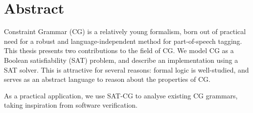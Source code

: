 \chapter*{Abstract}\label{chp:abstract}






Constraint Grammar (CG) is a relatively young formalism, born out of practical 
need for a robust and language-independent method for part-of-speech
tagging.
This thesis presents two contributions to the field of CG.
We model CG as a Boolean satisfiability (SAT) problem, and
describe an implementation using a SAT solver.
This is attractive for several reasons: formal logic is well-studied,
and serves as an abstract language to reason about the properties of
CG. 

As a practical application, we use SAT-CG to analyse existing CG
grammars, taking inspiration from software verification. 

